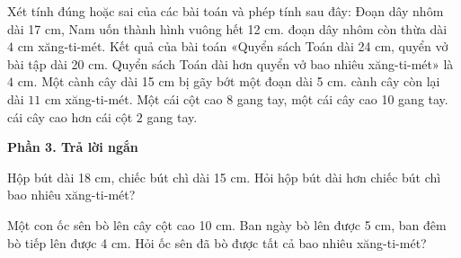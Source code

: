 \begin{ex} %
Xét tính đúng hoặc sai của các bài toán và phép tính sau đây:
\choiceTF
{Đoạn dây nhôm dài 17 cm, Nam uốn thành hình vuông hết 12 cm. đoạn dây nhôm còn thừa dài $4\text{ cm}$ xăng-ti-mét.}
{\True Kết quả của bài toán «Quyển sách Toán dài 24 cm, quyển vở bài tập dài 20 cm. Quyển sách Toán dài hơn quyển vở bao nhiêu xăng-ti-mét» là $4\text{ cm}$.}
{Một cành cây dài 15 cm bị gãy bớt một đoạn dài 5 cm. cành cây còn lại dài $11\text{ cm}$ xăng-ti-mét.}
{\True Một cái cột cao 8 gang tay, một cái cây cao 10 gang tay. cái cây cao hơn cái cột $2$ gang tay.}
\end{ex}

\textbf{Phần 3. Trả lời ngắn}

\begin{ex} %
Hộp bút dài 18 cm, chiếc bút chì dài 15 cm. Hỏi hộp bút dài hơn chiếc bút chì bao nhiêu xăng-ti-mét?
\end{ex}

\begin{ex} %
Một con ốc sên bò lên cây cột cao 10 cm. Ban ngày bò lên được 5 cm, ban đêm bò tiếp lên được 4 cm. Hỏi ốc sên đã bò được tất cả bao nhiêu xăng-ti-mét?
\end{ex}

